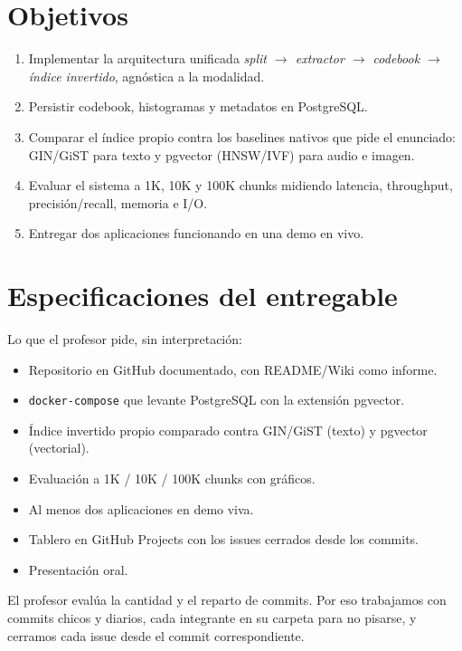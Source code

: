 \documentclass[11pt]{article}
\begin{document}
\section{Objetivos}

\begin{enumerate}[leftmargin=1.4em, itemsep=0.2em]
  \item Implementar la arquitectura unificada \emph{split $\rightarrow$ extractor $\rightarrow$ codebook $\rightarrow$ índice invertido}, agnóstica a la modalidad.
  \item Persistir codebook, histogramas y metadatos en PostgreSQL.
  \item Comparar el índice propio contra los baselines nativos que pide el enunciado: GIN/GiST para texto y pgvector (HNSW/IVF) para audio e imagen.
  \item Evaluar el sistema a 1K, 10K y 100K chunks midiendo latencia, throughput, precisión/recall, memoria e I/O.
  \item Entregar dos aplicaciones funcionando en una demo en vivo.
\end{enumerate}

\section{Especificaciones del entregable}

Lo que el profesor pide, sin interpretación:

\begin{itemize}[leftmargin=1.4em, itemsep=0.2em]
  \item Repositorio en GitHub documentado, con README/Wiki como informe.
  \item \texttt{docker-compose} que levante PostgreSQL con la extensión pgvector.
  \item Índice invertido propio comparado contra GIN/GiST (texto) y pgvector (vectorial).
  \item Evaluación a 1K / 10K / 100K chunks con gráficos.
  \item Al menos dos aplicaciones en demo viva.
  \item Tablero en GitHub Projects con los issues cerrados desde los commits.
  \item Presentación oral.
\end{itemize}

El profesor evalúa la cantidad y el reparto de commits. Por eso trabajamos con commits chicos y diarios, cada integrante en su carpeta para no pisarse, y cerramos cada issue desde el commit correspondiente.
\end{document}
